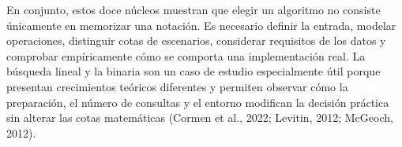En conjunto, estos doce núcleos muestran que elegir un algoritmo no consiste únicamente en memorizar una notación. Es necesario definir la entrada, modelar operaciones, distinguir cotas de escenarios, considerar requisitos de los datos y comprobar empíricamente cómo se comporta una implementación real. La búsqueda lineal y la binaria son un caso de estudio especialmente útil porque presentan crecimientos teóricos diferentes y permiten observar cómo la preparación, el número de consultas y el entorno modifican la decisión práctica sin alterar las cotas matemáticas (Cormen et al., 2022; Levitin, 2012; McGeoch, 2012).
